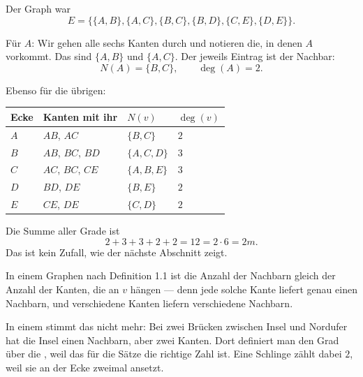 \begin{merksatz}
Der Graph war
\[ E = \bigl\{ \{A,B\}, \{A,C\}, \{B,C\}, \{B,D\}, \{C,E\}, \{D,E\} \bigr\}. \]

Für $A$: Wir gehen alle sechs Kanten durch und notieren die, in denen $A$ vorkommt. Das sind $\{A,B\}$ und $\{A,C\}$. Der jeweils  Eintrag ist der Nachbar:
\[ N(A) = \{B, C\}, \qquad \deg(A) = 2 . \]

Ebenso für die übrigen:
\begin{center}
\renewcommand{\arraystretch}{1.45}
\begin{tabular}{@{}P{1.2cm}P{3.2cm}P{2.2cm}P{1.6cm}@{}}
\toprule
\textbf{Ecke} & \textbf{Kanten mit ihr} & $N(v)$ & $\deg(v)$\\
\midrule
$A$ & $AB$, $AC$ & $\{B,C\}$ & $2$\\
$B$ & $AB$, $BC$, $BD$ & $\{A,C,D\}$ & $3$\\
$C$ & $AC$, $BC$, $CE$ & $\{A,B,E\}$ & $3$\\
$D$ & $BD$, $DE$ & $\{B,E\}$ & $2$\\
$E$ & $CE$, $DE$ & $\{C,D\}$ & $2$\\
\bottomrule
\end{tabular}
\end{center}

Die Summe aller Grade ist
\[ 2 + 3 + 3 + 2 + 2 = 12 = 2 \cdot 6 = 2m . \]
Das ist kein Zufall, wie der nächste Abschnitt zeigt.
\end{merksatz}

\begin{warnung}
In einem Graphen nach Definition 1.1 ist die Anzahl der Nachbarn gleich der Anzahl der Kanten, die an $v$ hängen --- denn jede solche Kante liefert genau einen Nachbarn, und verschiedene Kanten liefern verschiedene Nachbarn.

In einem  stimmt das nicht mehr: Bei zwei Brücken zwischen Insel und Nordufer hat die Insel einen Nachbarn, aber zwei Kanten. Dort definiert man den Grad über die , weil das für die Sätze die richtige Zahl ist. Eine Schlinge zählt dabei $2$, weil sie an der Ecke zweimal ansetzt.

\begin{center}
\begin{minipage}{0.88\textwidth}
\end{minipage}
\end{center}
\end{warnung}

